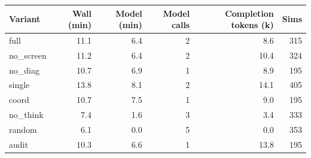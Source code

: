 \begin{tabular}{lrrrrr}
\toprule
Variant & Wall (min) & Model (min) & Model calls & Completion tokens (k) & Sims \\
\midrule
full & 11.1 & 6.4 & 2 & 8.6 & 315 \\
no\_screen & 11.2 & 6.4 & 2 & 10.4 & 324 \\
no\_diag & 10.7 & 6.9 & 1 & 8.9 & 195 \\
single & 13.8 & 8.1 & 2 & 14.1 & 405 \\
coord & 10.7 & 7.5 & 1 & 9.0 & 195 \\
no\_think & 7.4 & 1.6 & 3 & 3.4 & 333 \\
random & 6.1 & 0.0 & 5 & 0.0 & 353 \\
audit & 10.3 & 6.6 & 1 & 13.8 & 195 \\
\bottomrule
\end{tabular}
